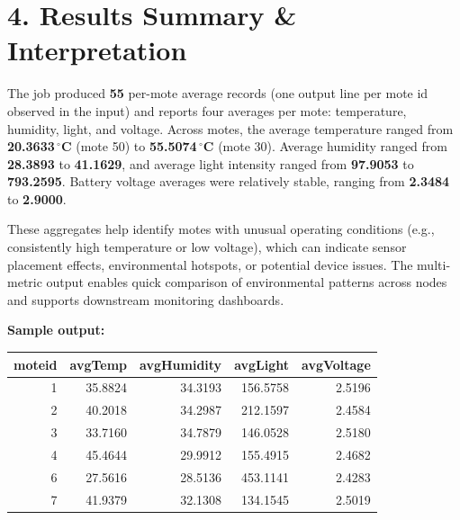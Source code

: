 \documentclass[12pt,a4paper]{article}
\begin{document}
\section*{4. Results Summary \& Interpretation}
The job produced \textbf{55} per-mote average records (one output line per mote id observed in the input) and reports four averages per mote: temperature, humidity, light, and voltage. Across motes, the average temperature ranged from \textbf{20.3633\,$^{\circ}$C} (mote 50) to \textbf{55.5074\,$^{\circ}$C} (mote 30). Average humidity ranged from \textbf{28.3893} to \textbf{41.1629}, and average light intensity ranged from \textbf{97.9053} to \textbf{793.2595}. Battery voltage averages were relatively stable, ranging from \textbf{2.3484} to \textbf{2.9000}.

These aggregates help identify motes with unusual operating conditions (e.g., consistently high temperature or low voltage), which can indicate sensor placement effects, environmental hotspots, or potential device issues. The multi-metric output enables quick comparison of environmental patterns across nodes and supports downstream monitoring dashboards.

\textbf{Sample output:}
\begin{center}
\footnotesize\ttfamily
\begin{tabular}{|r|r|r|r|r|}
\hline
moteid & avgTemp & avgHumidity & avgLight & avgVoltage\\
\hline
1 & 35.8824 & 34.3193 & 156.5758 & 2.5196\\
\hline
2 & 40.2018 & 34.2987 & 212.1597 & 2.4584\\
\hline
3 & 33.7160 & 34.7879 & 146.0528 & 2.5180\\
\hline
4 & 45.4644 & 29.9912 & 155.4915 & 2.4682\\
\hline
6 & 27.5616 & 28.5136 & 453.1141 & 2.4283\\
\hline
7 & 41.9379 & 32.1308 & 134.1545 & 2.5019\\
\hline
\end{tabular}
\end{center}
\end{document}
